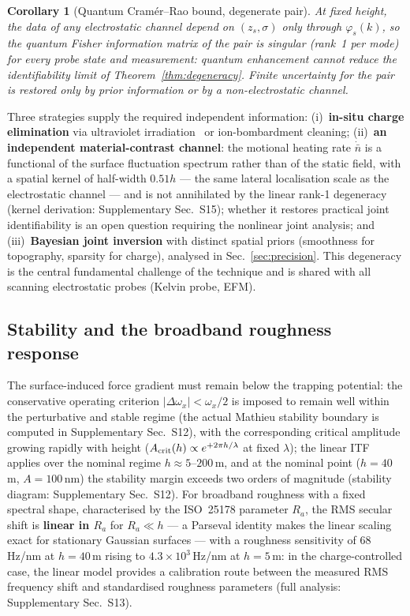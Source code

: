 \documentclass[12pt,a4paper]{article}
\newtheorem{corollary}[theorem]{Corollary}
\begin{document}
\begin{corollary}[Quantum Cram\'er--Rao bound, degenerate pair]\label{cor:qcrb_degenerate}
At fixed height, the data of any electrostatic channel depend on
$(z_s,\sigma)$ only through $\varphi_s(k)$, so the quantum Fisher
information matrix of the pair is singular (rank~1 per mode) for every
probe state and measurement: quantum enhancement cannot reduce the
identifiability limit of Theorem~\ref{thm:degeneracy}.  Finite uncertainty
for the pair is restored only by prior information or by a
non-electrostatic channel.
\end{corollary}

Three strategies supply the required independent information:
(i)~\textbf{in-situ charge elimination} via ultraviolet
irradiation~\cite{ziomba2025uv} or ion-bombardment cleaning;
(ii)~\textbf{an independent material-contrast channel}: the motional
heating rate $\dot{\bar{n}}$ is a functional of the surface fluctuation
spectrum rather than of the static field, with a spatial kernel of
half-width $0.51h$ --- the same lateral localisation scale as the
electrostatic channel --- and is not annihilated by the linear rank-1
degeneracy (kernel derivation: Supplementary Sec.~S15); whether it
restores practical joint identifiability is an open question requiring
the nonlinear joint analysis; and
(iii)~\textbf{Bayesian joint inversion} with distinct spatial priors
(smoothness for topography, sparsity for charge), analysed in
Sec.~\ref{sec:precision}.  This degeneracy is the central fundamental
challenge of the technique and is shared with all scanning electrostatic
probes (Kelvin probe, EFM).

\subsection{Stability and the broadband roughness response}

The surface-induced force gradient must remain below the trapping
potential: the conservative operating criterion
$|\Delta\omega_x|<\omega_x/2$ is imposed to remain well within the
perturbative and stable regime (the actual Mathieu stability boundary is
computed in Supplementary Sec.~S12), with the corresponding critical
amplitude growing rapidly with height
($A_{\rm crit}(h)\propto e^{+2\pi h/\lambda}$ at fixed $\lambda$); the
linear ITF applies over the nominal regime
$h\approx5$--$200$\,\textmu m, and at the nominal point
($h=40$\,\textmu m, $A=100$\,nm) the stability margin exceeds two orders
of magnitude (stability diagram: Supplementary Sec.~S12).  For broadband
roughness with a fixed spectral shape, characterised by the ISO~25178
parameter $R_a$, the RMS secular
shift is \textbf{linear in $R_a$} for $R_a\ll h$ --- a Parseval identity
makes the linear scaling exact for stationary Gaussian surfaces --- with a
roughness sensitivity of $68$\,Hz/nm at $h=40$\,\textmu m rising to
$4.3\times10^3$\,Hz/nm at $h=5$\,\textmu m: in the charge-controlled
case, the linear model provides a calibration route between the measured
RMS frequency shift and standardised roughness parameters (full analysis:
Supplementary Sec.~S13).
\end{document}

